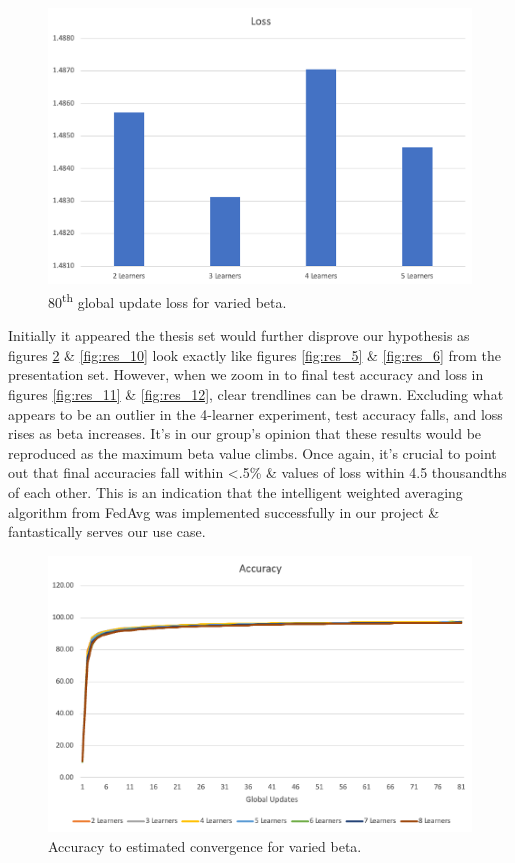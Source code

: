 \documentclass[../mthe-493-final-project.tex]{subfiles}
\begin{document}
    \begin{figure}
        \centering
        \includegraphics[width=138mm]{thesis/img/res_8.png}
        \caption{80\textsuperscript{th} global update loss for varied beta.}
        \label{fig:res_8}
    \end{figure}
    Initially it appeared the thesis set would further disprove our hypothesis as figures \ref{fig:res_9} \& \ref{fig:res_10} look exactly like figures \ref{fig:res_5} \& \ref{fig:res_6} from the presentation set. However, when we zoom in to final test accuracy and loss in figures \ref{fig:res_11} \& \ref{fig:res_12}, clear trendlines can be drawn. Excluding what appears to be an outlier in the 4-learner experiment, test accuracy falls, and loss rises as beta increases. It’s in our group’s opinion that these results would be reproduced as the maximum beta value climbs. Once again, it’s crucial to point out that final accuracies fall within <.5\% \& values of loss within 4.5 thousandths of each other. This is an indication that the intelligent weighted averaging algorithm from FedAvg was implemented successfully in our project \& fantastically serves our use case.
    \begin{figure}
        \centering
        \includegraphics[width=115mm]{thesis/img/res_9.png}
        \caption{Accuracy to estimated convergence for varied beta.}
        \label{fig:res_9}
    \end{figure}
\end{document}

